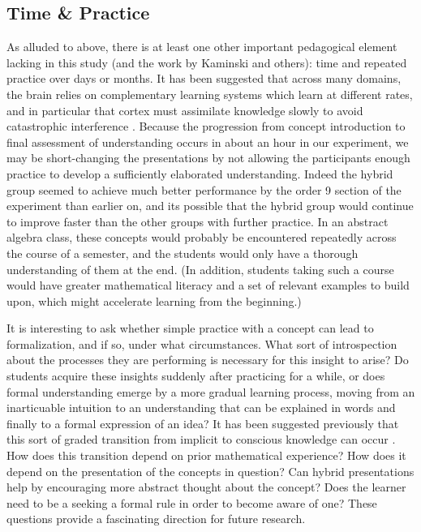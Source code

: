 \documentclass[man,10pt]{apa6}
\begin{document}
\subsection{Time \& Practice}
As alluded to above, there is at least one other important pedagogical element lacking in this study (and the work by Kaminski and others): time and repeated practice over days or months. It has been suggested that across many domains, the brain relies on complementary learning systems which learn at different rates, and in particular that cortex must assimilate knowledge slowly to avoid catastrophic interference \cite{Kumaran2016}. Because the progression from concept introduction to final assessment of understanding occurs in about an hour in our experiment, we may be short-changing the presentations by not allowing the participants enough practice to develop a sufficiently elaborated understanding. Indeed the hybrid group seemed to achieve much better performance by the order 9 section of the experiment than earlier on, and its possible that the hybrid group would continue to improve faster than the other groups with further practice. In an abstract algebra class, these concepts would probably be encountered repeatedly across the course of a semester, and the students would only have a thorough understanding of them at the end. (In addition, students taking such a course would have greater mathematical literacy and a set of relevant examples to build upon, which might accelerate learning from the beginning.)\par
It is interesting to ask whether simple practice with a concept can lead to formalization, and if so, under what circumstances. What sort of introspection about the processes they are performing is necessary for this insight to arise? Do students acquire these insights suddenly after practicing for a while, or does formal understanding emerge by a more gradual learning process, moving from an inarticuable intuition to an understanding that can be explained in words and finally to a formal expression of an idea? It has been suggested previously that this sort of graded transition from implicit to conscious knowledge can occur \cite{Cleeremans2002}. How does this transition depend on prior mathematical experience? How does it depend on the presentation of the concepts in question? Can hybrid presentations help by encouraging more abstract thought about the concept? Does the learner need to be a seeking a formal rule in order to become aware of one? These questions provide a fascinating direction for future research. 
\end{document}
